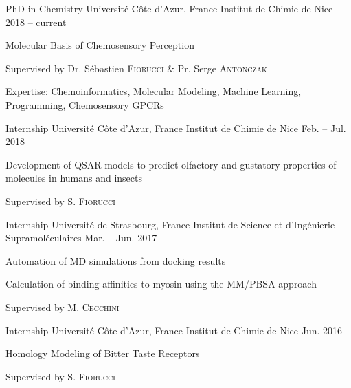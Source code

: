 \vspace{-1em}

\begin{minipage}[t]{.49\linewidth}
% 
    \begin{cventries}
% 
        \cventryvar
            {PhD in Chemistry}
            {Université Côte d'Azur, France}
            {Institut de Chimie de Nice}
            {2018 -- current}
            {
            \begin{cvitems}
                \item{Molecular Basis of Chemosensory Perception}
                \item{Supervised by Dr. Sébastien \textsc{Fiorucci} \& Pr. Serge \textsc{Antonczak}}
                \item{Expertise: Chemoinformatics, Molecular Modeling, Machine Learning, Programming, Chemosensory GPCRs}
            \end{cvitems}
            }
% 
        \cventryvar
            {Internship}
            {Université Côte d'Azur, France}
            {Institut de Chimie de Nice}
            {Feb. -- Jul. 2018}
            {
            \begin{cvitems}
                \item{Development of QSAR models to predict olfactory and gustatory \mbox{properties} of molecules in humans and insects}
                \item{Supervised by S. \textsc{Fiorucci}}
            \end{cvitems}
            }

        \cventryvar
            {Internship}
            {Université de Strasbourg, France}
            {Institut de Science et d'Ingénierie Supramoléculaires}
            {Mar. -- Jun. 2017}
            {
            \begin{cvitems}
                \item{Automation of MD simulations from docking results}
                \item{Calculation of binding affinities to myosin using the MM/PBSA \mbox{approach}}
                \item{Supervised by M. \textsc{Cecchini}}
            \end{cvitems}
            }
% 
        \cventryvar
            {Internship}
            {Université Côte d'Azur, France}
            {Institut de Chimie de Nice}
            {Jun. 2016}
            {
            \begin{cvitems}
                \item{Homology Modeling of Bitter Taste Receptors}
                \item{Supervised by S. \textsc{Fiorucci}}
            \end{cvitems}
            }
% 
    \end{cventries}
% 
\end{minipage}
